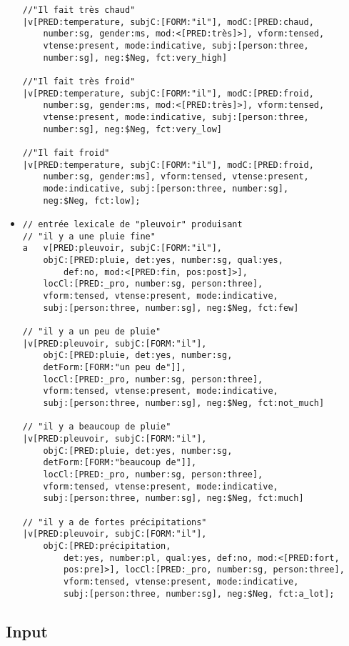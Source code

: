 \documentclass[11pt]{article}
\begin{document}
\begin{itemize}
\begin{verbatim}
//"Il fait très chaud"
|v[PRED:temperature, subjC:[FORM:"il"], modC:[PRED:chaud, 
	number:sg, gender:ms, mod:<[PRED:très]>], vform:tensed, 
	vtense:present, mode:indicative, subj:[person:three, 
	number:sg], neg:$Neg, fct:very_high]

//"Il fait très froid"
|v[PRED:temperature, subjC:[FORM:"il"], modC:[PRED:froid, 
	number:sg, gender:ms, mod:<[PRED:très]>], vform:tensed,
	vtense:present, mode:indicative, subj:[person:three, 
	number:sg], neg:$Neg, fct:very_low]

//"Il fait froid"
|v[PRED:temperature, subjC:[FORM:"il"], modC:[PRED:froid, 
	number:sg, gender:ms], vform:tensed, vtense:present, 
	mode:indicative, subj:[person:three, number:sg], 
	neg:$Neg, fct:low]; 
\end{verbatim}
	
\bigskip
\item \begin{verbatim}
// entrée lexicale de "pleuvoir" produisant
// "il y a une pluie fine"
a	v[PRED:pleuvoir, subjC:[FORM:"il"], 
	objC:[PRED:pluie, det:yes, number:sg, qual:yes,
		def:no, mod:<[PRED:fin, pos:post]>], 
	locCl:[PRED:_pro, number:sg, person:three], 
	vform:tensed, vtense:present, mode:indicative, 
	subj:[person:three, number:sg], neg:$Neg, fct:few]
	
// "il y a un peu de pluie"
|v[PRED:pleuvoir, subjC:[FORM:"il"], 
	objC:[PRED:pluie, det:yes, number:sg, 
	detForm:[FORM:"un peu de"]], 
	locCl:[PRED:_pro, number:sg, person:three], 
	vform:tensed, vtense:present, mode:indicative, 
	subj:[person:three, number:sg], neg:$Neg, fct:not_much]

// "il y a beaucoup de pluie"
|v[PRED:pleuvoir, subjC:[FORM:"il"], 
	objC:[PRED:pluie, det:yes, number:sg, 
	detForm:[FORM:"beaucoup de"]], 
	locCl:[PRED:_pro, number:sg, person:three], 
	vform:tensed, vtense:present, mode:indicative, 
	subj:[person:three, number:sg], neg:$Neg, fct:much]

// "il y a de fortes précipitations"
|v[PRED:pleuvoir, subjC:[FORM:"il"], 
	objC:[PRED:précipitation,
        det:yes, number:pl, qual:yes, def:no, mod:<[PRED:fort,
        pos:pre]>], locCl:[PRED:_pro, number:sg, person:three],
        vform:tensed, vtense:present, mode:indicative,
        subj:[person:three, number:sg], neg:$Neg, fct:a_lot]; 
\end{verbatim}

\end{itemize}

\subsection{Input}
\end{document}
